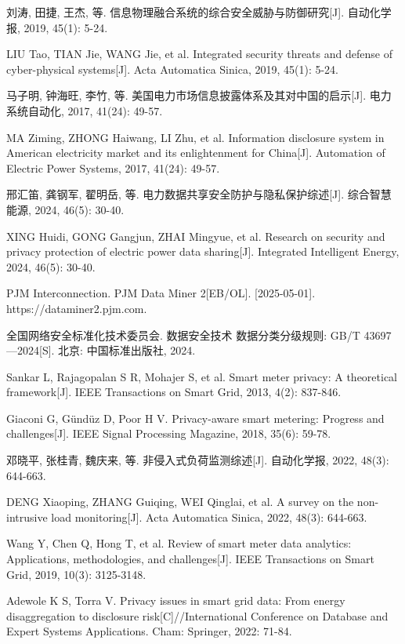 刘涛, 田捷, 王杰, 等. 信息物理融合系统的综合安全威胁与防御研究[J]. 自动化学报, 2019, 45(1): 5-24.

LIU Tao, TIAN Jie, WANG Jie, et al. Integrated security threats and defense of cyber-physical systems[J]. Acta Automatica Sinica, 2019, 45(1): 5-24.

马子明, 钟海旺, 李竹, 等. 美国电力市场信息披露体系及其对中国的启示[J]. 电力系统自动化, 2017, 41(24): 49-57.

MA Ziming, ZHONG Haiwang, LI Zhu, et al. Information disclosure system in American electricity market and its enlightenment for China[J]. Automation of Electric Power Systems, 2017, 41(24): 49-57.

邢汇笛, 龚钢军, 翟明岳, 等. 电力数据共享安全防护与隐私保护综述[J]. 综合智慧能源, 2024, 46(5): 30-40.

XING Huidi, GONG Gangjun, ZHAI Mingyue, et al. Research on security and privacy protection of electric power data sharing[J]. Integrated Intelligent Energy, 2024, 46(5): 30-40.

PJM Interconnection. PJM Data Miner 2[EB/OL]. [2025-05-01]. https://dataminer2.pjm.com.

全国网络安全标准化技术委员会. 数据安全技术 数据分类分级规则: GB/T 43697—2024[S]. 北京: 中国标准出版社, 2024.

Sankar L, Rajagopalan S R, Mohajer S, et al. Smart meter privacy: A theoretical framework[J]. IEEE Transactions on Smart Grid, 2013, 4(2): 837-846.

Giaconi G, Gündüz D, Poor H V. Privacy-aware smart metering: Progress and challenges[J]. IEEE Signal Processing Magazine, 2018, 35(6): 59-78.

邓晓平, 张桂青, 魏庆来, 等. 非侵入式负荷监测综述[J]. 自动化学报, 2022, 48(3): 644-663.

DENG Xiaoping, ZHANG Guiqing, WEI Qinglai, et al. A survey on the non-intrusive load monitoring[J]. Acta Automatica Sinica, 2022, 48(3): 644-663.

Wang Y, Chen Q, Hong T, et al. Review of smart meter data analytics: Applications, methodologies, and challenges[J]. IEEE Transactions on Smart Grid, 2019, 10(3): 3125-3148.

Adewole K S, Torra V. Privacy issues in smart grid data: From energy disaggregation to disclosure risk[C]//International Conference on Database and Expert Systems Applications. Cham: Springer, 2022: 71-84.

